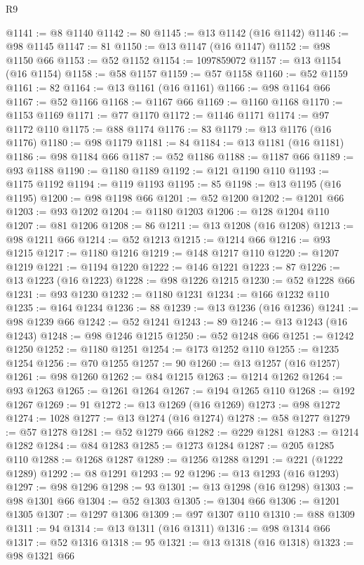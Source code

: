 \begin{lexlean}{R9}
\begin{coremodule}
@1141 := @8 @1140
@1142 := 80
@1145 := @13 @1142 (@16 @1142)
@1146 := @98 @1145
@1147 := 81
@1150 := @13 @1147 (@16 @1147)
@1152 := @98 @1150 @66
@1153 := @52 @1152
@1154 := 1097859072
@1157 := @13 @1154 (@16 @1154)
@1158 := @58 @1157
@1159 := @57 @1158
@1160 := @52 @1159
@1161 := 82
@1164 := @13 @1161 (@16 @1161)
@1166 := @98 @1164 @66
@1167 := @52 @1166
@1168 := @1167 @66
@1169 := @1160 @1168
@1170 := @1153 @1169
@1171 := @77 @1170
@1172 := @1146 @1171
@1174 := @97 @1172 @110
@1175 := @88 @1174
@1176 := 83
@1179 := @13 @1176 (@16 @1176)
@1180 := @98 @1179
@1181 := 84
@1184 := @13 @1181 (@16 @1181)
@1186 := @98 @1184 @66
@1187 := @52 @1186
@1188 := @1187 @66
@1189 := @93 @1188
@1190 := @1180 @1189
@1192 := @121 @1190 @110
@1193 := @1175 @1192
@1194 := @119 @1193
@1195 := 85
@1198 := @13 @1195 (@16 @1195)
@1200 := @98 @1198 @66
@1201 := @52 @1200
@1202 := @1201 @66
@1203 := @93 @1202
@1204 := @1180 @1203
@1206 := @128 @1204 @110
@1207 := @81 @1206
@1208 := 86
@1211 := @13 @1208 (@16 @1208)
@1213 := @98 @1211 @66
@1214 := @52 @1213
@1215 := @1214 @66
@1216 := @93 @1215
@1217 := @1180 @1216
@1219 := @148 @1217 @110
@1220 := @1207 @1219
@1221 := @1194 @1220
@1222 := @146 @1221
@1223 := 87
@1226 := @13 @1223 (@16 @1223)
@1228 := @98 @1226 @1215
@1230 := @52 @1228 @66
@1231 := @93 @1230
@1232 := @1180 @1231
@1234 := @166 @1232 @110
@1235 := @164 @1234
@1236 := 88
@1239 := @13 @1236 (@16 @1236)
@1241 := @98 @1239 @66
@1242 := @52 @1241
@1243 := 89
@1246 := @13 @1243 (@16 @1243)
@1248 := @98 @1246 @1215
@1250 := @52 @1248 @66
@1251 := @1242 @1250
@1252 := @1180 @1251
@1254 := @173 @1252 @110
@1255 := @1235 @1254
@1256 := @70 @1255
@1257 := 90
@1260 := @13 @1257 (@16 @1257)
@1261 := @98 @1260
@1262 := @84 @1215
@1263 := @1214 @1262
@1264 := @93 @1263
@1265 := @1261 @1264
@1267 := @194 @1265 @110
@1268 := @192 @1267
@1269 := 91
@1272 := @13 @1269 (@16 @1269)
@1273 := @98 @1272
@1274 := 1028
@1277 := @13 @1274 (@16 @1274)
@1278 := @58 @1277
@1279 := @57 @1278
@1281 := @52 @1279 @66
@1282 := @229 @1281
@1283 := @1214 @1282
@1284 := @84 @1283
@1285 := @1273 @1284
@1287 := @205 @1285 @110
@1288 := @1268 @1287
@1289 := @1256 @1288
@1291 := @221 (@1222 @1289)
@1292 := @8 @1291
@1293 := 92
@1296 := @13 @1293 (@16 @1293)
@1297 := @98 @1296
@1298 := 93
@1301 := @13 @1298 (@16 @1298)
@1303 := @98 @1301 @66
@1304 := @52 @1303
@1305 := @1304 @66
@1306 := @1201 @1305
@1307 := @1297 @1306
@1309 := @97 @1307 @110
@1310 := @88 @1309
@1311 := 94
@1314 := @13 @1311 (@16 @1311)
@1316 := @98 @1314 @66
@1317 := @52 @1316
@1318 := 95
@1321 := @13 @1318 (@16 @1318)
@1323 := @98 @1321 @66

\end{coremodule}
\end{lexlean}
